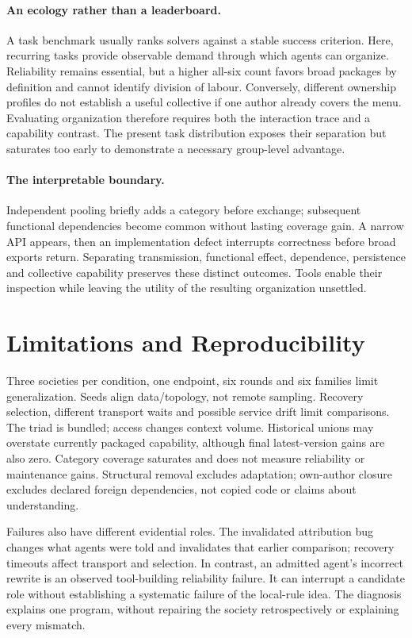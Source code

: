 \documentclass[sigconf,anonymous]{aamas}
\begin{document}
\paragraph{An ecology rather than a leaderboard.} A task benchmark usually ranks solvers against a stable success criterion. Here, recurring tasks provide observable demand through which agents can organize. Reliability remains essential, but a higher all-six count favors broad packages by definition and cannot identify division of labour. Conversely, different ownership profiles do not establish a useful collective if one author already covers the menu. Evaluating organization therefore requires both the interaction trace and a capability contrast. The present task distribution exposes their separation but saturates too early to demonstrate a necessary group-level advantage.

\paragraph{The interpretable boundary.} Independent pooling briefly adds a category before exchange; subsequent functional dependencies become common without lasting coverage gain. A narrow API appears, then an implementation defect interrupts correctness before broad exports return. Separating transmission, functional effect, dependence, persistence and collective capability preserves these distinct outcomes. Tools enable their inspection while leaving the utility of the resulting organization unsettled.

\section{Limitations and Reproducibility}
Three societies per condition, one endpoint, six rounds and six families limit generalization. Seeds align data/topology, not remote sampling. Recovery selection, different transport waits and possible service drift limit comparisons. The triad is bundled; access changes context volume. Historical unions may overstate currently packaged capability, although final latest-version gains are also zero. Category coverage saturates and does not measure reliability or maintenance gains. Structural removal excludes adaptation; own-author closure excludes declared foreign dependencies, not copied code or claims about understanding.

Failures also have different evidential roles. The invalidated attribution bug changes what agents were told and invalidates that earlier comparison; recovery timeouts affect transport and selection. In contrast, an admitted agent's incorrect rewrite is an observed tool-building reliability failure. It can interrupt a candidate role without establishing a systematic failure of the local-rule idea. The diagnosis explains one program, without repairing the society retrospectively or explaining every mismatch.
\end{document}
